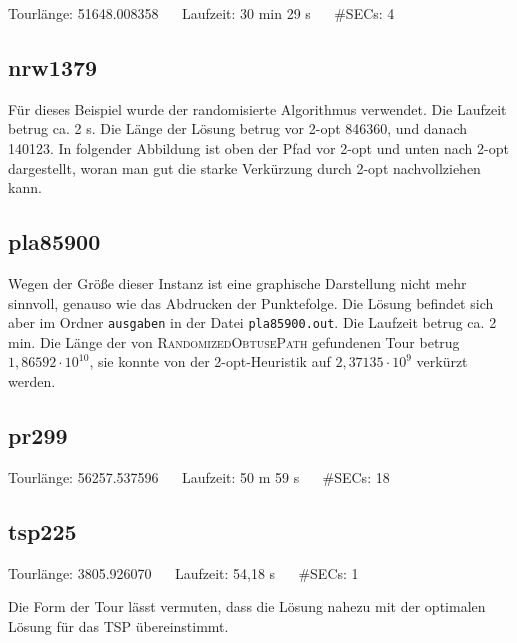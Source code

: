 \documentclass[a4paper, 10pt, ngerman]{article}
\begin{document}


\noindent Tourlänge: 51648.008358 $\quad$ Laufzeit: 30 min 29 s $\quad$ \#SECs: 4

\subsection{nrw1379}

Für dieses Beispiel wurde der randomisierte Algorithmus verwendet. Die Laufzeit betrug ca. 2 s. Die Länge der Lösung betrug vor 2-opt 846360, und danach 140123. In folgender Abbildung ist oben der Pfad vor 2-opt und unten nach 2-opt dargestellt, woran man gut die starke Verkürzung durch 2-opt nachvollziehen kann.

\noindent 

\noindent 

\subsection{pla85900}

Wegen der Größe dieser Instanz ist eine graphische Darstellung nicht mehr sinnvoll, genauso wie das Abdrucken der Punktefolge. Die Lösung befindet sich aber im Ordner \verb|ausgaben| in der Datei \verb|pla85900.out|. Die Laufzeit betrug ca. 2 min. Die Länge der von \textsc{RandomizedObtusePath} gefundenen Tour betrug $1,86592 \cdot 10^{10}$, sie konnte von der 2-opt-Heuristik auf $2,37135 \cdot 10^9$ verkürzt werden.

\subsection{pr299}



\noindent Tourlänge: 56257.537596 $\quad$ Laufzeit: 50 m 59 s $\quad$ \#SECs: 18

\subsection{tsp225}



\noindent Tourlänge: 3805.926070 $\quad$ Laufzeit: 54,18 s $\quad$ \#SECs: 1
\medskip

\noindent Die Form der Tour lässt vermuten, dass die Lösung nahezu mit der optimalen Lösung für das TSP übereinstimmt.
\end{document}

